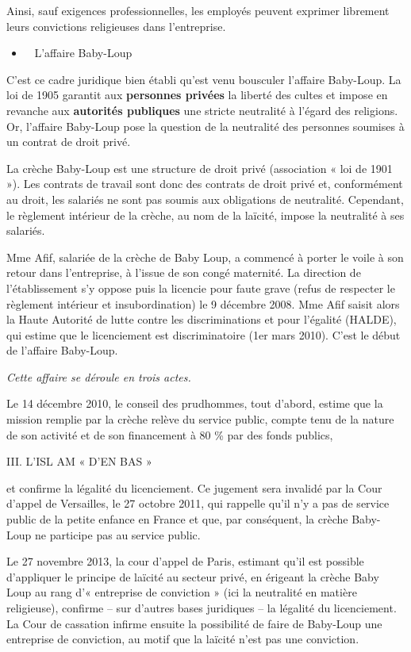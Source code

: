 Ainsi, sauf exigences professionnelles, les employés peuvent exprimer
librement leurs convictions religieuses dans l'entreprise.


\begin{itemize}
\item ~
  L'affaire Baby-Loup
\end{itemize}


C'est ce cadre juridique bien établi qu'est venu bousculer l'affaire
Baby-Loup. La loi de 1905 garantit aux \textbf{personnes privées} la
liberté des cultes et impose en revanche aux \textbf{autorités
publiques} une stricte neutralité à l'égard des religions. Or, l'affaire
Baby-Loup pose la question de la neutralité des personnes soumises à un
contrat de droit privé.

La crèche Baby-Loup est une structure de droit privé (association « loi
de 1901 »). Les contrats de travail sont donc des contrats de droit
privé et, conformément au droit, les salariés ne sont pas soumis aux
obligations de neutralité. Cependant, le règlement intérieur de la
crèche, au nom de la laïcité, impose la neutralité à ses salariés.

Mme Afif, salariée de la crèche de Baby Loup, a commencé à porter le
voile à son retour dans l'entreprise, à l'issue de son congé maternité.
La direction de l'établissement s'y oppose puis la licencie pour faute
grave (refus de respecter le règlement intérieur et insubordination) le
9 décembre 2008. Mme Afif saisit alors la Haute Autorité de lutte contre
les discriminations et pour l'égalité (HALDE), qui estime que le
licenciement est discriminatoire (1er mars 2010). C'est le début de
l'affaire Baby-Loup.

\emph{Cette affaire se déroule en trois actes.}

Le 14 décembre 2010, le conseil des prudhommes, tout d'abord, estime que
la mission remplie par la crèche relève du service public, compte tenu
de la nature de son activité et de son financement à 80 \% par des fonds
publics,

III. L'ISL AM « D'EN BAS »

et confirme la légalité du licenciement. Ce jugement sera invalidé par
la Cour d'appel de Versailles, le 27 octobre 2011, qui rappelle qu'il
n'y a pas de service public de la petite enfance en France et que, par
conséquent, la crèche Baby- Loup ne participe pas au service public.

Le 27 novembre 2013, la cour d'appel de Paris, estimant qu'il est
possible d'appliquer le principe de laïcité au secteur privé, en
érigeant la crèche Baby Loup au rang d'« entreprise de conviction » (ici
la neutralité en matière religieuse), confirme -- sur d'autres bases
juridiques -- la légalité du licenciement. La Cour de cassation infirme
ensuite la possibilité de faire de Baby-Loup une entreprise de
conviction, au motif que la laïcité n'est pas une conviction.

